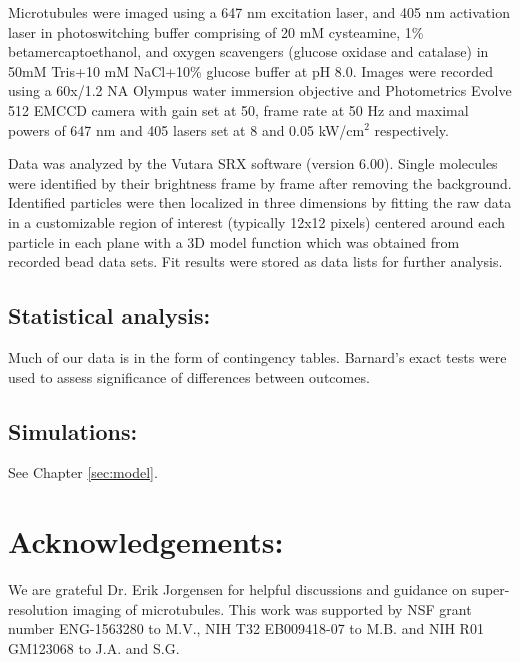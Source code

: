 Microtubules were imaged using a 647 nm excitation laser, and 405 nm activation laser in photoswitching buffer comprising of 20 mM cysteamine, 1\% betamercaptoethanol, and oxygen scavengers (glucose oxidase and catalase) in 50mM Tris+10 mM NaCl+10\% glucose buffer at pH 8.0. Images were recorded using a 60x/1.2 NA Olympus water immersion objective and Photometrics Evolve 512 EMCCD camera with gain set at 50, frame rate at 50 Hz and maximal powers of 647 nm and 405 lasers set at 8 and 0.05 kW/cm$^2$ respectively.

Data was analyzed by the Vutara SRX software (version 6.00). Single molecules were identified by their brightness frame by frame after removing the background. Identified particles were then localized in three dimensions by fitting the raw data in a customizable region of interest (typically 12x12 pixels) centered around each particle in each plane with a 3D model function which was obtained from recorded bead data sets. Fit results were stored as data lists for further analysis.

\subsection{Statistical analysis:}

Much of our data is in the form of contingency tables. Barnard's exact tests were used to assess significance of differences between outcomes.

\subsection{Simulations:}

See Chapter \ref{sec:model}.

\section{Acknowledgements:}

We are grateful Dr. Erik Jorgensen for helpful discussions and guidance on super-resolution imaging of microtubules. This work was supported by NSF grant number ENG-1563280 to M.V., NIH T32 EB009418-07 to M.B. and NIH R01 GM123068 to J.A. and S.G.